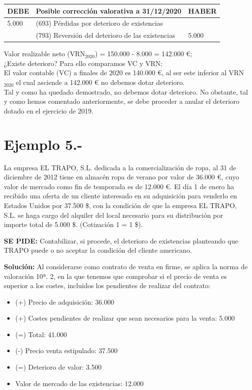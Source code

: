 \documentclass{article}
\begin{document}
\begin{table}[h!]
    \centering
    \begin{tabular}{|l|l|l|}
    \hline
    \textbf{DEBE} & \textbf{Posible corrección valorativa a 31/12/2020} & \textbf{HABER} \\
    \hline
    5.000 & (693) Pérdidas por deterioro de existencias & \\
     & (793) Reversión del deterioro de las existencias & 5.000 \\
    \hline
    \end{tabular}
\end{table}
    
Valor realizable neto (VRN\(_{2020}\)) = 150.000 - 8.000 = 142.000 €; \\
¿Existe deterioro? Para ello comparamos VC y VRN; \\
El valor contable (VC) a finales de 2020 es 140.000 €, al ser este inferior al VRN\(_{2020}\) el cual asciende a 142.000 € no debemos dotar deterioro.\\

Tal y como ha quedado demostrado, no debemos dotar deterioro. No obstante, tal y como hemos comentado anteriormente, se debe proceder a anular el deterioro dotado en el ejercicio de 2019.

\section*{Ejemplo 5.-} La empresa EL TRAPO, S.L. dedicada a la comercialización de ropa, al 31 de diciembre de 2012 tiene en almacén ropa de verano por valor de 36.000 €, cuyo valor de mercado como fin de temporada es de 12.000 €. El día 1 de enero ha recibido una oferta de un cliente interesado en su adquisición para venderlo en Estados Unidos por 37.500 \$, con la condición de que la empresa EL TRAPO, S.L. se haga cargo del alquiler del local necesario para su distribución por importe total de 5.000 \$. (Cotización 1  = 1 \$).

\textbf{SE PIDE:} Contabilizar, si procede, el deterioro de existencias planteando que TRAPO puede o no aceptar la condición del cliente americano.

\textbf{Solución:} Al considerarse como contrato de venta en firme, se aplica la norma de valoración 10ª. 2, en la que tenemos que comprobar si el precio de venta es superior a los costes, incluidos los pendientes de realizar del contrato:

\begin{itemize}
    \item (+) Precio de adquisición: 36.000
    \item (+) Costes pendientes de realizar que sean necesarios para la venta: 5.000
    \item (=) Total: 41.000
    \item (-) Precio venta estipulado: 37.500
    \item (=) Deterioro de valor: 3.500
    \item Valor de mercado de las existencias: 12.000

\end{itemize}
\end{document}
